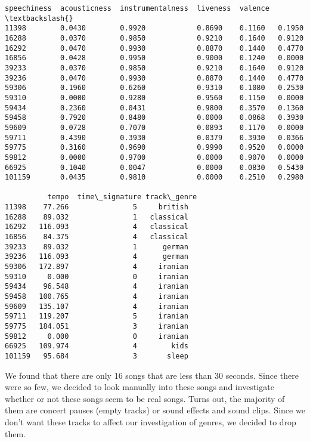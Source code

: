\documentclass[11pt]{article}
\begin{document}
\begin{tcolorbox}[breakable, size=fbox, boxrule=.5pt, pad at break*=1mm, opacityfill=0]
\begin{Verbatim}[commandchars=\\\{\}]
        speechiness  acousticness  instrumentalness  liveness  valence  \textbackslash{}
11398        0.0430        0.9920            0.8690    0.1160   0.1950
16288        0.0370        0.9850            0.9210    0.1640   0.9120
16292        0.0470        0.9930            0.8870    0.1440   0.4770
16856        0.0428        0.9950            0.9000    0.1240   0.0000
39233        0.0370        0.9850            0.9210    0.1640   0.9120
39236        0.0470        0.9930            0.8870    0.1440   0.4770
59306        0.1960        0.6260            0.9310    0.1080   0.2530
59310        0.0000        0.9280            0.9560    0.1150   0.0000
59434        0.2360        0.0431            0.9800    0.3570   0.1360
59458        0.7920        0.8480            0.0000    0.0868   0.3930
59609        0.0728        0.7070            0.0893    0.1170   0.0000
59711        0.4390        0.3930            0.0379    0.3930   0.0366
59775        0.3160        0.9690            0.9990    0.9520   0.0000
59812        0.0000        0.9700            0.0000    0.9070   0.0000
66925        0.1040        0.0047            0.0000    0.0830   0.5430
101159       0.0435        0.9810            0.0000    0.2510   0.2980

          tempo  time\_signature track\_genre
11398    77.266               5     british
16288    89.032               1   classical
16292   116.093               4   classical
16856    84.375               4   classical
39233    89.032               1      german
39236   116.093               4      german
59306   172.897               4     iranian
59310     0.000               0     iranian
59434    96.548               4     iranian
59458   100.765               4     iranian
59609   135.107               4     iranian
59711   119.207               5     iranian
59775   184.051               3     iranian
59812     0.000               0     iranian
66925   109.974               4        kids
101159   95.684               3       sleep
\end{Verbatim}
\end{tcolorbox}
        
    We found that there are only 16 songs that are less than 30 seconds.
Since there were so few, we decided to look manually into these songs
and investigate whether or not these songs seem to be real songs. Turns
out, the majority of them are concert pauses (empty tracks) or sound
effects and sound clips. Since we don't want these tracks to affect our
investigation of genres, we decided to drop them.
\end{document}
